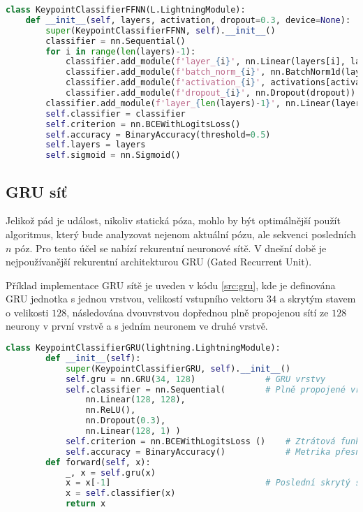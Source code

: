 \begin{lstlisting}[language=Python, label=src:ffnn_params, caption={Parametrizace konfigurace dopředné sítě}] 
class KeypointClassifierFFNN(L.LightningModule):
    def __init__(self, layers, activation, dropout=0.3, device=None):
        super(KeypointClassifierFFNN, self).__init__()        
        classifier = nn.Sequential()
        for i in range(len(layers)-1):
            classifier.add_module(f'layer_{i}', nn.Linear(layers[i], layers[i+1]))
            classifier.add_module(f'batch_norm_{i}', nn.BatchNorm1d(layers[i+1]))
            classifier.add_module(f'activation_{i}', activations[activation])
            classifier.add_module(f'dropout_{i}', nn.Dropout(dropout))
        classifier.add_module(f'layer_{len(layers)-1}', nn.Linear(layers[-1], 1))
        self.classifier = classifier
        self.criterion = nn.BCEWithLogitsLoss()
        self.accuracy = BinaryAccuracy(threshold=0.5)
        self.layers = layers
        self.sigmoid = nn.Sigmoid()   
\end{lstlisting}

\subsection{GRU síť}

Jelikož pád je událost, nikoliv statická póza, mohlo by být optimálnější použít
algoritmus, který bude analyzovat nejenom aktuální pózu, ale sekvenci
posledních $n$ póz. Pro tento účel se nabízí rekurentní neuronové sítě. V
dnešní době je nejpoužívanější rekurentní architekturou GRU (Gated Recurrent
Unit).

Příklad implementace GRU sítě je uveden v kódu \ref{src:gru}, kde je definována
GRU jednotka s jednou vrstvou, velikostí vstupního vektoru $34$ a skrytým
stavem o velikosti $128$, následována dvouvrstvou dopřednou plně propojenou sítí
ze $128$ neurony v první vrstvě a s jedním neuronem ve druhé vrstvě.

\begin{lstlisting}[language=Python, label=src:gru, caption={Ukázka implementace GRU sítě v PyTorch Lightning}]
    class KeypointClassifierGRU(lightning.LightningModule):
        def __init__(self):
            super(KeypointClassifierGRU, self).__init__()
            self.gru = nn.GRU(34, 128)              # GRU vrstvy
            self.classifier = nn.Sequential(        # Plně propojené vrstvy
                nn.Linear(128, 128),
                nn.ReLU(),
                nn.Dropout(0.3),
                nn.Linear(128, 1) )
            self.criterion = nn.BCEWithLogitsLoss ()    # Ztrátová funkce
            self.accuracy = BinaryAccuracy()            # Metrika přesnosti
        def forward(self, x):
            _, x = self.gru(x)
            x = x[-1]                               # Poslední skrytý stav
            x = self.classifier(x)
            return x
    
\end{lstlisting}

